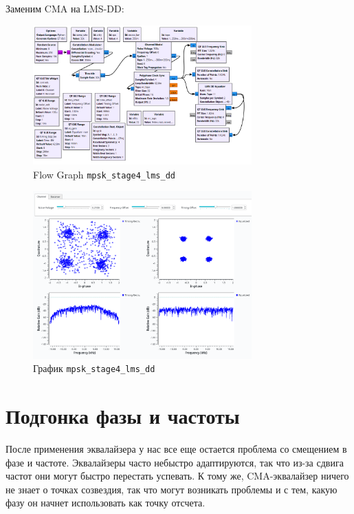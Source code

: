 \documentclass[a4paper,12pt]{report}
\begin{document}
    Заменим CMA на LMS-DD:
    
    \begin{figure}[H]
        \centering
        \includegraphics[width=0.75\textwidth]{images/mpsk_stage4_lms_dd_fg.png}
        \caption{Flow Graph \texttt{mpsk\_stage4\_lms\_dd}}
        \label{fig:mpsk_stage4_lms_dd_fg}
    \end{figure}
    
    \begin{figure}[H]
        \centering
        \includegraphics[width=0.75\textwidth]{images/mpsk_stage4_lms_dd_plot.png}
        \caption{График \texttt{mpsk\_stage4\_lms\_dd}}
        \label{fig:mpsk_stage4_lms_dd_plot}
    \end{figure}
    
    \chapter{Подгонка фазы и частоты}
    
    После применения эквалайзера у нас все еще остается проблема со смещением в фазе и частоте. Эквалайзеры часто небыстро адаптируются, так что из-за сдвига частот они могут быстро перестать успевать. К тому же, CMA-эквалайзер ничего не знает о точках созвездия, так что могут возникать проблемы и с тем, какую фазу он начнет использовать как точку отсчета.
    
\end{document}
